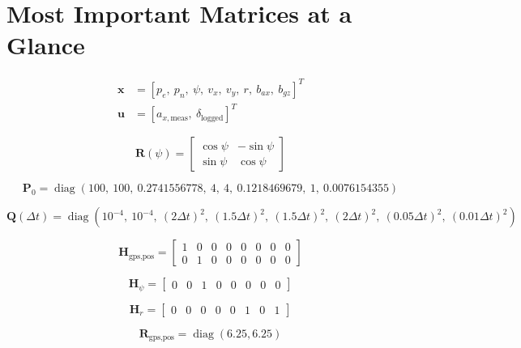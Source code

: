 \documentclass[11pt]{article}
\newcommand{\vect}[1]{\boldsymbol{#1}}
\newcommand{\mat}[1]{\mathbf{#1}}
\newcommand{\diag}{\operatorname{diag}}
\begin{document}
\section{Most Important Matrices at a Glance}

\begin{align}
\vect{x} &= [p_e,\ p_n,\ \psi,\ v_x,\ v_y,\ r,\ b_{ax},\ b_{gz}]^T \\
\vect{u} &= [a_{x,\text{meas}},\ \delta_{\text{logged}}]^T
\end{align}

\begin{equation}
\mat{R}(\psi) =
\begin{bmatrix}
\cos\psi & -\sin\psi \\
\sin\psi & \cos\psi
\end{bmatrix}
\end{equation}

\begin{equation}
\mat{P}_0 = \diag(100,\ 100,\ 0.2741556778,\ 4,\ 4,\ 0.1218469679,\ 1,\ 0.0076154355)
\end{equation}

\begin{equation}
\mat{Q}(\Delta t) = \diag(10^{-4},\ 10^{-4},\ (2\Delta t)^2,\ (1.5\Delta t)^2,\ (1.5\Delta t)^2,\ (2\Delta t)^2,\ (0.05\Delta t)^2,\ (0.01\Delta t)^2)
\end{equation}

\begin{equation}
\mat{H}_{\text{gps,pos}} =
\begin{bmatrix}
1 & 0 & 0 & 0 & 0 & 0 & 0 & 0 \\
0 & 1 & 0 & 0 & 0 & 0 & 0 & 0
\end{bmatrix}
\end{equation}

\begin{equation}
\mat{H}_{\psi} =
\begin{bmatrix}
0 & 0 & 1 & 0 & 0 & 0 & 0 & 0
\end{bmatrix}
\end{equation}

\begin{equation}
\mat{H}_{r} =
\begin{bmatrix}
0 & 0 & 0 & 0 & 0 & 1 & 0 & 1
\end{bmatrix}
\end{equation}

\begin{equation}
\mat{R}_{\text{gps,pos}} = \diag(6.25, 6.25)
\end{equation}
\end{document}

